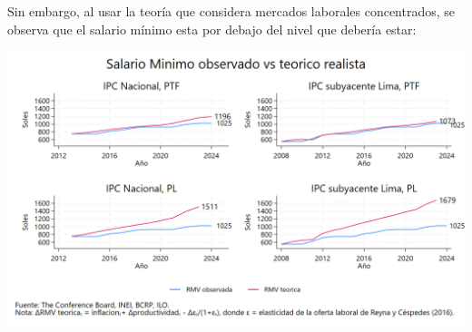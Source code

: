 \documentclass{beamer}
\begin{document}
\begin{frame}{Sin embargo, al usar la teoría que considera mercados laborales concentrados, se observa que el salario mínimo esta por debajo del nivel que debería estar:}
    \begin{center}
        \includegraphics[width=\linewidth]{rmv_determination_cone.png}
    \end{center}
\end{frame}
\end{document}
